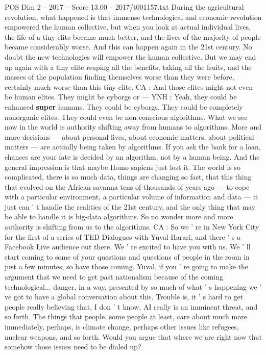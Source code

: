\begin{textsample}{POS Dim 2 – 2017 – Score 13.00 – 2017/t001157.txt}
During the agricultural revolution, what happened is that immense technological and economic revolution empowered the human collective, but when you look at actual individual lives, the life of a tiny elite became much better, and the lives of the majority of people became considerably worse.
And this can happen again in the 21st century.
No doubt the new technologies will empower the human collective.
But we may end up again with a tiny elite reaping all the benefits, taking all the fruits, and the masses of the population finding themselves worse than they were before, certainly much worse than this tiny elite.
CA : And those elites might not even be human elites.
They might be cyborgs or — YNH : Yeah, they could be enhanced \textbf{super} humans.
They could be cyborgs.
They could be completely nonorganic elites.
They could even be non-conscious algorithms.
What we see now in the world is authority shifting away from humans to algorithms.
More and more decisions — about personal lives, about economic matters, about political matters — are actually being taken by algorithms.
If you ask the bank for a loan, chances are your fate is decided by an algorithm, not by a human being.
And the general impression is that maybe Homo sapiens just lost it.
The world is so complicated, there is so much data, things are changing so fast, that this thing that evolved on the African savanna tens of thousands of years ago — to cope with a particular environment, a particular volume of information and data — it just can ' t handle the realities of the 21st century, and the only thing that may be able to handle it is big-data algorithms.
So no wonder more and more authority is shifting from us to the algorithms.
CA : So we ' re in New York City for the first of a series of TED Dialogues with Yuval Harari, and there ' s a Facebook Live audience out there.
We ' re excited to have you with us.
We ' ll start coming to some of your questions and questions of people in the room in just a few minutes, so have those coming.
Yuval, if you ' re going to make the argument that we need to get past nationalism because of the coming technological... danger, in a way, presented by so much of what ' s happening we ' ve got to have a global conversation about this.
Trouble is, it ' s hard to get people really believing that, I don ' t know, AI really is an imminent threat, and so forth.
The things that people, some people at least, care about much more immediately, perhaps, is climate change, perhaps other issues like refugees, nuclear weapons, and so forth.
Would you argue that where we are right now that somehow those issues need to be dialed up?

\end{textsample}
